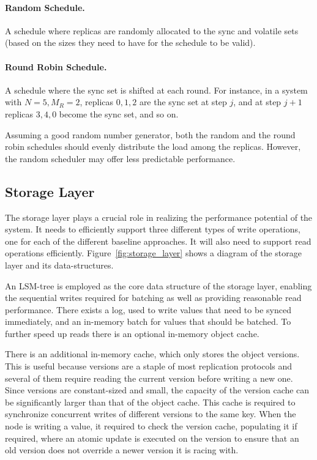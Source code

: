 \paragraph{Random Schedule.} A schedule where replicas are
randomly allocated to the sync and volatile sets (based on the
sizes they need to have for the schedule to be valid).

\paragraph{Round Robin Schedule.} A schedule where the sync set
is shifted at each round. For instance, in a system with $N = 5,
M_R = 2$, replicas $0, 1, 2$ are the sync set at step $j$, and
at step $j + 1$ replicas $3, 4, 0$ become the sync set, and so
on.

Assuming a good random number generator, both the random and the
round robin schedules should evenly distribute the load among the
replicas. However, the random scheduler may offer less
predictable performance.

\subsection{Storage Layer}\label{ssec:storage}

The storage layer plays a crucial role in realizing the
performance potential of the system. It needs to efficiently support
three different types of write operations, one for each of the
different baseline approaches. It will also need to support read operations
efficiently. Figure~\ref{fig:storage_layer} shows a diagram of
the storage layer and its data-structures.

An \ac{LSM-tree} is employed as the core data structure of the storage
layer, enabling the sequential writes required for batching as
well as providing reasonable read performance. There exists a
log, used to write values that need to be synced immediately, and
an in-memory batch for values that should be batched. To further speed
up reads there is an optional in-memory object cache.

There is an additional in-memory cache, which only stores the
object versions. This is useful because versions are a staple of
most replication protocols and several of them require reading
the current version before writing a new one. Since versions are
constant-sized and small, the capacity of the version cache can
be significantly larger than that of the object cache. This cache
is required to synchronize concurrent writes of different
versions to the same key. When the node is writing a value, it required to
check the version cache, populating it if required, where an
atomic update is executed on the version to ensure that an old
version does not override a newer version it is racing with.

